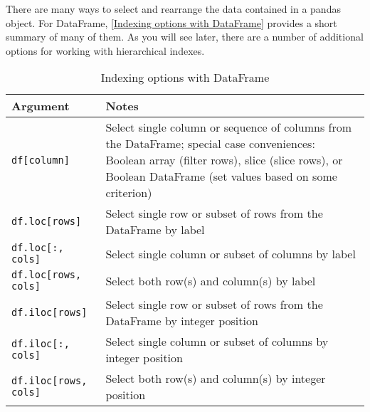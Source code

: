 There are many ways to select and rearrange the data contained in a pandas object. For DataFrame, \autoref{Indexing options with DataFrame} provides a short summary of many of them. As you will see later, there are a number of additional options for working with hierarchical indexes.
\begin{table}
    \caption{Indexing options with DataFrame}
    \label{Indexing options with DataFrame}
    \begin{tabularx}{\textwidth}{lX}
        \hline
        Argument                   & Notes                                                                                                                                                                                                 \\
        \hline
        \verb|df[column]|          & Select single column or sequence of columns from the DataFrame; special case conveniences: Boolean array (filter rows), slice (slice rows), or Boolean DataFrame (set values based on some criterion) \\
        \verb|df.loc[rows]|        & Select single row or subset of rows from the DataFrame by label                                                                                                                                       \\
        \verb|df.loc[:, cols]|     & Select single column or subset of columns by label                                                                                                                                                    \\
        \verb|df.loc[rows, cols]|  & Select both row(s) and column(s) by label                                                                                                                                                             \\
        \verb|df.iloc[rows]|       & Select single row or subset of rows from the DataFrame by integer position                                                                                                                            \\
        \verb|df.iloc[:, cols]|    & Select single column or subset of columns by integer position                                                                                                                                         \\
        \verb|df.iloc[rows, cols]| & Select both row(s) and column(s) by integer position                                                                                                                                                  \\

\end{tabularx}
\end{table}

